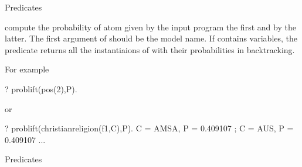 \documentclass[letterpaper,10pt,english]{sphinxmanual}
\begin{document}
\sphinxAtStartPar
Predicates

\begin{sphinxVerbatim}[commandchars=\\\{\}]
  
  
\end{sphinxVerbatim}

\sphinxAtStartPar
compute the probability of atom  given by the
input program the first and by  the latter.
The first argument of  should be the model name.
If  contains variables, the predicate returns
all the instantiaions of  with their probabilities in backtracking.

\sphinxAtStartPar
For example

\begin{sphinxVerbatim}[commandchars=\\\{\}]
?\PYGZhy{} prob\PYGZus{}lift(pos(2),P).
\end{sphinxVerbatim}

\sphinxAtStartPar
or

\begin{sphinxVerbatim}[commandchars=\\\{\}]
?\PYGZhy{} prob\PYGZus{}lift(christian\PYGZus{}religion(f1,C),P).
C = \PYGZsq{}AMSA\PYGZsq{},
P = 0.409107 ;
C = \PYGZsq{}AUS\PYGZsq{},
P = 0.409107
...
\end{sphinxVerbatim}

\sphinxAtStartPar
Predicates

\begin{sphinxVerbatim}[commandchars=\\\{\}]
  
  
\end{sphinxVerbatim}
\end{document}
